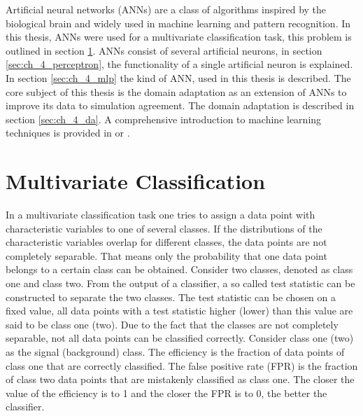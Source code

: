 
Artificial neural networks (ANNs) are a class of algorithms inspired by the biological brain and widely used in machine learning and pattern recognition. In this thesis, ANNs were used for a multivariate classification task, this problem is outlined in section \ref{sec:ch_4_classification}. ANNs consist of several artificial neurons, in section \ref{sec:ch_4_perceptron}, the functionality of a single artificial neuron is explained. In section \ref{sec:ch_4_mlp} the kind of ANN, used in this thesis is described. The core subject of this thesis is the domain adaptation as an extension of ANNs to improve its data to simulation agreement. The domain adaptation is described in section \ref{sec:ch_4_da}. A comprehensive introduction to machine learning techniques is provided in \cite{Bishop} or \cite{DeepLearningBook}. 

\section{Multivariate Classification}\label{sec:ch_4_classification}
In a multivariate classification task one tries to assign a data point with characteristic variables to one of several classes. If the distributions of the characteristic variables overlap for different classes, the data points are not completely separable. That means only the probability that one data point belongs to a certain class can be obtained. Consider two classes, denoted as class one and class two. From the output of a classifier, a so called test statistic can be constructed to separate the two classes. The test statistic can be chosen on a fixed value, all data points with a test statistic higher (lower) than this value are said to be class one (two). Due to the fact that the classes are not completely separable, not all data points can be classified correctly. Consider class one (two) as the signal (background) class. The efficiency is the fraction of data points of class one that are correctly classified. The false positive rate (FPR) is the fraction of class two data points that are mistakenly classified as class one. The closer the value of the efficiency is to 1 and the closer the FPR is to 0, the better the classifier.\\

